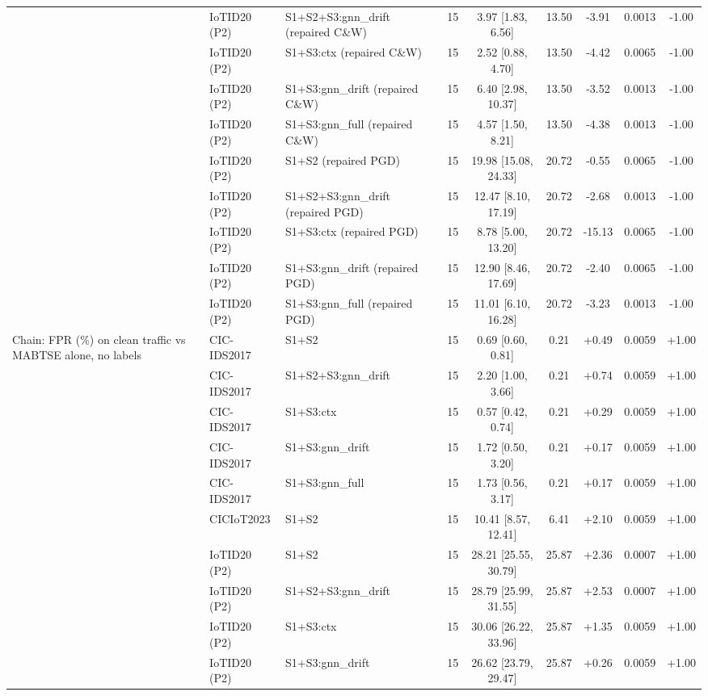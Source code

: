 \begin{table}[t]
\begin{tabular}{lllcccccc}
 & IoTID20 (P2) & S1+S2+S3:gnn\_drift (repaired C\&W) & 15 & 3.97 [1.83, 6.56] & 13.50 & -3.91 & 0.0013 & -1.00 \\
 & IoTID20 (P2) & S1+S3:ctx (repaired C\&W) & 15 & 2.52 [0.88, 4.70] & 13.50 & -4.42 & 0.0065 & -1.00 \\
 & IoTID20 (P2) & S1+S3:gnn\_drift (repaired C\&W) & 15 & 6.40 [2.98, 10.37] & 13.50 & -3.52 & 0.0013 & -1.00 \\
 & IoTID20 (P2) & S1+S3:gnn\_full (repaired C\&W) & 15 & 4.57 [1.50, 8.21] & 13.50 & -4.38 & 0.0013 & -1.00 \\
 & IoTID20 (P2) & S1+S2 (repaired PGD) & 15 & 19.98 [15.08, 24.33] & 20.72 & -0.55 & 0.0065 & -1.00 \\
 & IoTID20 (P2) & S1+S2+S3:gnn\_drift (repaired PGD) & 15 & 12.47 [8.10, 17.19] & 20.72 & -2.68 & 0.0013 & -1.00 \\
 & IoTID20 (P2) & S1+S3:ctx (repaired PGD) & 15 & 8.78 [5.00, 13.20] & 20.72 & -15.13 & 0.0065 & -1.00 \\
 & IoTID20 (P2) & S1+S3:gnn\_drift (repaired PGD) & 15 & 12.90 [8.46, 17.69] & 20.72 & -2.40 & 0.0065 & -1.00 \\
 & IoTID20 (P2) & S1+S3:gnn\_full (repaired PGD) & 15 & 11.01 [6.10, 16.28] & 20.72 & -3.23 & 0.0013 & -1.00 \\
Chain: FPR (\%) on clean traffic vs MABTSE alone, no labels & CIC-IDS2017 & S1+S2 & 15 & 0.69 [0.60, 0.81] & 0.21 & +0.49 & 0.0059 & +1.00 \\
 & CIC-IDS2017 & S1+S2+S3:gnn\_drift & 15 & 2.20 [1.00, 3.66] & 0.21 & +0.74 & 0.0059 & +1.00 \\
 & CIC-IDS2017 & S1+S3:ctx & 15 & 0.57 [0.42, 0.74] & 0.21 & +0.29 & 0.0059 & +1.00 \\
 & CIC-IDS2017 & S1+S3:gnn\_drift & 15 & 1.72 [0.50, 3.20] & 0.21 & +0.17 & 0.0059 & +1.00 \\
 & CIC-IDS2017 & S1+S3:gnn\_full & 15 & 1.73 [0.56, 3.17] & 0.21 & +0.17 & 0.0059 & +1.00 \\
 & CICIoT2023 & S1+S2 & 15 & 10.41 [8.57, 12.41] & 6.41 & +2.10 & 0.0059 & +1.00 \\
 & IoTID20 (P2) & S1+S2 & 15 & 28.21 [25.55, 30.79] & 25.87 & +2.36 & 0.0007 & +1.00 \\
 & IoTID20 (P2) & S1+S2+S3:gnn\_drift & 15 & 28.79 [25.99, 31.55] & 25.87 & +2.53 & 0.0007 & +1.00 \\
 & IoTID20 (P2) & S1+S3:ctx & 15 & 30.06 [26.22, 33.96] & 25.87 & +1.35 & 0.0059 & +1.00 \\
 & IoTID20 (P2) & S1+S3:gnn\_drift & 15 & 26.62 [23.79, 29.47] & 25.87 & +0.26 & 0.0059 & +1.00 \\

\end{tabular}
\end{table}
